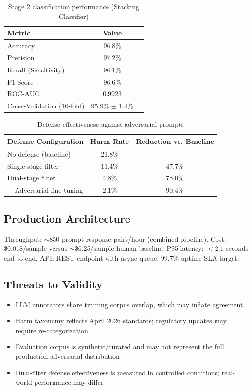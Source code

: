 \documentclass[11pt,a4paper]{article}
\begin{document}
\begin{table}[H]
\centering
\caption{Stage 2 classification performance (Stacking Classifier)}
\begin{tabular}{lcc}
\toprule
\textbf{Metric} & \textbf{Value} \\
\midrule
Accuracy & 96.8\% \\
Precision & 97.2\% \\
Recall (Sensitivity) & 96.1\% \\
F1-Score & 96.6\% \\
ROC-AUC & 0.9923 \\
Cross-Validation (10-fold) & 95.9\% $\pm$ 1.4\% \\
\bottomrule
\end{tabular}
\label{tab:ai_classifier}
\end{table}

\begin{table}[H]
\centering
\caption{Defense effectiveness against adversarial prompts}
\small
\begin{tabular}{lcc}
\toprule
\textbf{Defense Configuration} & \textbf{Harm Rate} & \textbf{Reduction vs. Baseline} \\
\midrule
No defense (baseline) & 21.8\% & --- \\
Single-stage filter & 11.4\% & 47.7\% \\
Dual-stage filter & 4.8\% & 78.0\% \\
+ Adversarial fine-tuning & 2.1\% & 90.4\% \\
\bottomrule
\end{tabular}
\label{tab:defense}
\end{table}

\subsection{Production Architecture}

Throughput: $\sim$850 prompt-response pairs/hour (combined pipeline). Cost: \$0.018/sample versus $\sim$\$6.25/sample human baseline. P95 latency: $< 2.1$ seconds end-to-end. API: REST endpoint with async queue; 99.7\% uptime SLA target.

\subsection{Threats to Validity}

\begin{itemize}[leftmargin=*]
    \item LLM annotators share training corpus overlap, which may inflate agreement
    \item Harm taxonomy reflects April 2026 standards; regulatory updates may require re-categorization
    \item Evaluation corpus is synthetic/curated and may not represent the full production adversarial distribution
    \item Dual-filter defense effectiveness is measured in controlled conditions; real-world performance may differ
\end{itemize}
\end{document}
